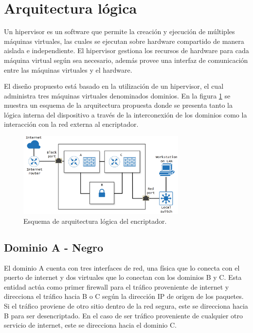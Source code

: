 \documentclass[12pt]{article}
\begin{document}
\section{Arquitectura lógica}

Un hipervisor es un software que permite la creación y ejecución de múltiples máquinas virtuales, las cuales se ejecutan sobre hardware compartido de manera aislada e independiente. El hipervisor gestiona los recursos de hardware para cada máquina virtual según sea necesario, además provee una interfaz de comunicación entre las máquinas virtuales y el hardware.

El diseño propuesto está basado en la utilización de un hipervisor, el cual administra tres máquinas virtuales denominados dominios. En la figura \ref{fig:arquitectura_logica} se muestra un esquema de la arquitectura propuesta donde se presenta tanto la lógica interna del dispositivo a través de la interconexión de los dominios como la interacción con la red externa al encriptador.

\begin{figure}[h!]
    \centering
    \includegraphics[width=0.75\textwidth]{images/arquitectura_logica.png}
    \caption{Esquema de arquitectura lógica del encriptador.}
    \label{fig:arquitectura_logica}
\end{figure}

\subsection{Dominio A - Negro}
El dominio A cuenta con tres interfaces de red, una física que lo conecta con el puerto de internet y dos virtuales que lo conectan con los dominios B y C.
Esta entidad actúa como primer firewall para el tráfico proveniente de internet y direcciona el tráfico hacia B o C según la dirección IP de origen de los paquetes. Si el tráfico proviene de otro sitio dentro de la red segura, este se direcciona hacia B para ser desencriptado. En el caso de ser tráfico proveniente de cualquier otro servicio de internet, este se direcciona hacia el dominio C.
\end{document}
